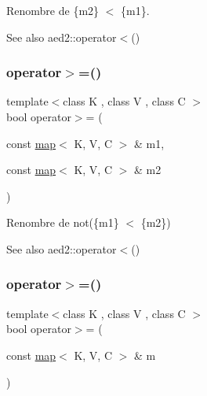 Renombre de \{m2\} $<$ \{m1\}. 

\begin{DoxySeeAlso}{See also}
aed2\+::operator$<$() 
\end{DoxySeeAlso}
\mbox{\label{classaed2_1_1map_a093a6d1a055339c5fc6297a1d47a9159}} 
\subsubsection{\texorpdfstring{operator$>$=()}{operator>=()}\hspace{0.1cm}{\footnotesize\ttfamily [1/2]}}
{\footnotesize\ttfamily template$<$class K , class V , class C $>$ \\
bool operator$>$= (\begin{DoxyParamCaption}\item[{const \hyperlink{classaed2_1_1map}{map}$<$ K, V, C $>$ \&}]{m1,  }\item[{const \hyperlink{classaed2_1_1map}{map}$<$ K, V, C $>$ \&}]{m2 }\end{DoxyParamCaption})\hspace{0.3cm}{\ttfamily [related]}}



Renombre de not(\{m1\} $<$ \{m2\}) 

\begin{DoxySeeAlso}{See also}
aed2\+::operator$<$() 
\end{DoxySeeAlso}
\mbox{\label{classaed2_1_1map_a68bf5a52b77446e43584fb67d22c365e}} 
\subsubsection{\texorpdfstring{operator$>$=()}{operator>=()}\hspace{0.1cm}{\footnotesize\ttfamily [2/2]}}
{\footnotesize\ttfamily template$<$class K , class V , class C $>$ \\
bool operator$>$= (\begin{DoxyParamCaption}\item[{const \hyperlink{classaed2_1_1map}{map}$<$ K, V, C $>$ \&}]{m }\end{DoxyParamCaption})\hspace{0.3cm}{\ttfamily [related]}}



